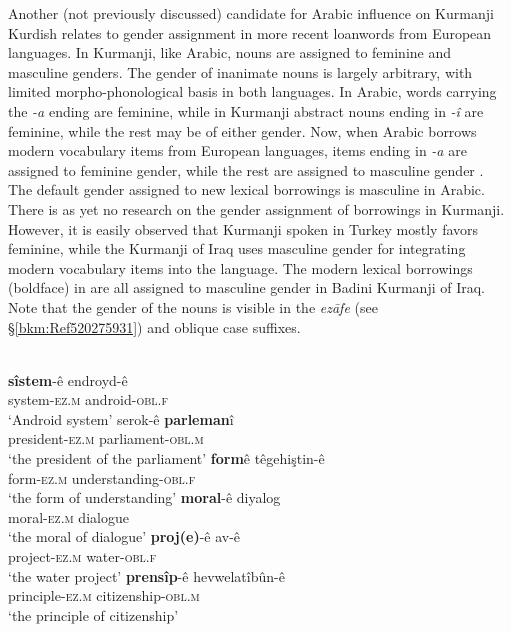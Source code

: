 \documentclass[output=paper]{langsci/langscibook}
\begin{document}
Another (not previously discussed) candidate for Arabic influence on Kurmanji Kurdish relates to gender assignment in more recent loanwords from European languages. In Kurmanji, like Arabic, nouns are assigned to feminine and masculine genders. The gender of inanimate nouns is largely arbitrary, with limited morpho-phonological basis in both languages. In Arabic, words carrying the \textit{{}-a} ending are feminine, while in Kurmanji abstract nouns ending in \textit{-î} are feminine, while the rest may be of either gender. Now, when Arabic borrows modern vocabulary items from European languages, items ending in \textit{{}-a} are assigned to feminine gender, while the rest are assigned to masculine gender \citep[5]{Ibrahim2015}. The default gender assigned to new lexical borrowings is masculine in Arabic. There is as yet no research on the gender assignment of borrowings in Kurmanji. However, it is easily observed that Kurmanji spoken in Turkey mostly favors feminine, while the Kurmanji of Iraq uses masculine gender for integrating modern vocabulary items into the language. The modern lexical borrowings (boldface) in  are all assigned to masculine gender in Badini Kurmanji of Iraq. Note that the gender of the nouns is visible in the \textit{ezāfe} (see §\ref{bkm:Ref520275931}) and oblique case suffixes. 

{}\label{bkm:Ref14712415}\\
\ea 
\gll \textbf{sîstem}-ê endroyd-ê\\
     system-\textsc{ez.m} android-\textsc{obl.f}\\
\glt ‘Android system’
\ex\label{parl}
\gll serok-ê \textbf{parleman}î\\
     president-\textsc{ez.m} parliament-\textsc{obl.m}\\
\glt ‘the president of the parliament’
\ex \gll \textbf{form}ê têgehiştin-ê\\
     form-\textsc{ez.m} understanding\textsc{{}-obl.f}\\
\glt ‘the form of understanding’
\ex \gll \textbf{moral}-ê diyalog\\
     moral-\textsc{ez.m} dialogue\\
\glt ‘the moral of dialogue’
\ex \gll \textbf{proj(e)}-ê av-ê\\
     project-\textsc{ez.m} water-\textsc{obl.f}\\
\glt ‘the water project’
\ex
\gll \textbf{prensîp}-ê hevwelatîbûn-ê\\
     principle-\textsc{ez.m} citizenship-\textsc{obl.m}\\
\glt ‘the principle of citizenship’
\z
\z
\end{document}
